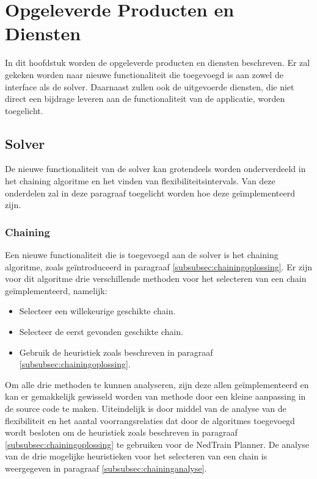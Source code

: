 \section{Opgeleverde Producten en Diensten}
In dit hoofdstuk worden de opgeleverde producten en diensten beschreven. Er zal gekeken worden naar nieuwe functionaliteit die toegevoegd is aan zowel de interface als de solver. Daarnaast zullen ook de uitgevoerde diensten, die niet direct een bijdrage leveren aan de functionaliteit van de applicatie, worden toegelicht.

\subsection{Solver}
De nieuwe functionaliteit van de solver kan grotendeels worden onderverdeeld in het chaining algoritme en het vinden van flexibiliteitsintervals. Van deze onderdelen zal in deze paragraaf toegelicht worden hoe deze ge\"implementeerd zijn.

\subsubsection{Chaining}
Een nieuwe functionaliteit die is toegevoegd aan de solver is het chaining algoritme, zoals ge\"introduceerd in paragraaf \ref{subsubsec:chainingoplossing}. Er zijn voor dit algoritme drie verschillende methoden voor het selecteren van een chain ge\"implementeerd, namelijk:

\begin{itemize}
\item Selecteer een willekeurige geschikte chain.
\item Selecteer de eerst gevonden geschikte chain.
\item Gebruik de heuristiek zoals beschreven in paragraaf \ref{subsubsec:chainingoplossing}.
\end{itemize}

Om alle drie methoden te kunnen analyseren, zijn deze allen ge\"implementeerd en kan er gemakkelijk gewisseld worden van methode door een kleine aanpassing in de source code te maken. Uiteindelijk is door middel van de analyse van de flexibiliteit en het aantal voorrangsrelaties dat door de algoritmes toegevoegd wordt besloten om de heuristiek zoals beschreven in paragraaf \ref{subsubsec:chainingoplossing} te gebruiken voor de NedTrain Planner. De analyse van de drie mogelijke heuristieken voor het selecteren van een chain is weergegeven in paragraaf \ref{subsubsec:chaininganalyse}.

